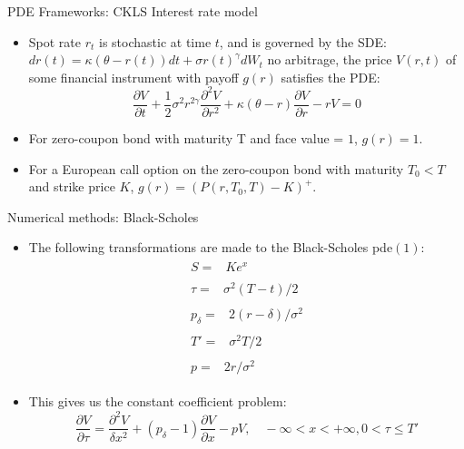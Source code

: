 \documentclass{beamer}
\begin{document}
\begin{frame}{PDE Frameworks: CKLS Interest rate model}
    \begin{itemize}
        \item Spot rate $r_{t}$ is stochastic at time $t$, and is governed by the SDE: $
    dr(t) = \kappa(\theta - r(t))dt + \sigma r(t)^{\gamma}dW_{t}$
    \itemUnder no arbitrage, the price $V(r,t)$ of some financial instrument with payoff $g(r)$ satisfies the PDE:
    \begin{equation}
    \dfrac{\partial V}{\partial t} + \frac{1}{2} \sigma^{2}r^{2\gamma}\frac{\partial^{2}V}{\partial r^{2}} + \kappa(\theta
    -r)\frac{\partial V}{\partial r} - rV = 0
    \end{equation}
    \item For zero-coupon bond with maturity T and face value = $1$, $g(r) = 1$.
    \item For a European call option on the zero-coupon bond with maturity $T_{0} < T$ and strike price $K$, $g(r) = (P(r,T_{0},T)-K)^{+}$.
    \end{itemize}
\end{frame}
 
\begin{frame}{Numerical methods: Black-Scholes}
\begin{itemize}
\item The following transformations are made to the Black-Scholes pde$(1)$: 
\begin{align*}
    \begin{split}
        S = {}& Ke^{x}
    \end{split}\\
    \begin{split}
        \tau ={}& \sigma^{2}(T-t)/2
    \end{split}\\
    \begin{split}
        p_{\delta} ={}& 2(r-\delta)/\sigma^{2}
    \end{split}\\
    \begin{split}
        T' ={}& \sigma^{2}T/2 
    \end{split}\\
    \begin{split}
        p ={}& 2r/\sigma^{2}
    \end{split}
\end{align*}
 
\item This gives us the constant coefficient problem:
\begin{equation*}
    \frac{\partial V}{\partial \tau} = \frac{\partial^{2} V}{\delta x^{2}} + (p_{\delta}-1)\frac{\partial V}{\partial x}-pV, \quad -\infty < x< +\infty, 0 < \tau \le T'
\end{equation*}
\end{itemize}
\end{frame}
 
\end{document}
